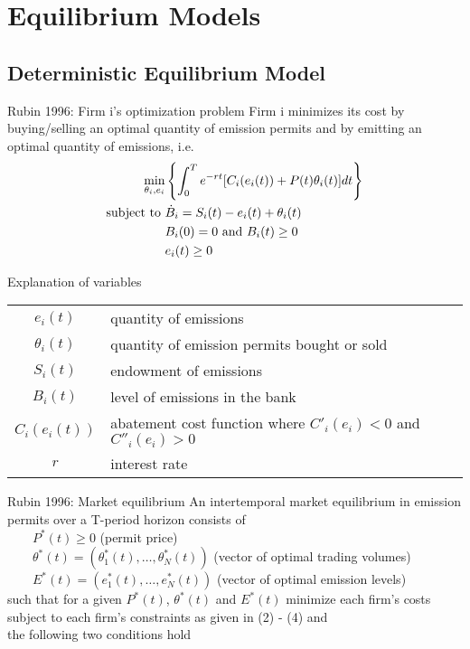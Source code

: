 \section{Equilibrium Models}
\subsection{Deterministic Equilibrium Model}

Rubin 1996: Firm i's optimization problem
	Firm i minimizes its cost by buying/selling an optimal quantity of emission permits and by emitting an optimal quantity of emissions, i.e.
		\begin{align}
		\min_{\theta_i, e_i} & \left\{ \int_0^T e^{-rt} [C_i(e_i(t)) + P(t)\theta_i(t)]dt \right\} \\
		\textnormal{subject to }
		&\dot{B}_i = S_i(t) - e_i(t) + \theta_i(t) \\
		&            B_i(0) = 0 \textnormal{ and } B_i(t) \ge 0 \\
		&            e_i(t) \ge 0
		\end{align}

	{Explanation of variables}
	\begin{tiny}
	\begin{tabular}{cl}
	$e_i(t)$ & quantity of emissions \\
	$\theta_i(t)$ & quantity of emission permits bought or sold \\
	$S_i(t)$ & endowment of emissions \\
	$B_i(t)$ & level of emissions in the bank\\
	$C_i(e_i(t))$ & abatement cost function where $C'_i(e_i) < 0$ and $C''_i(e_i) > 0$ \\
	$r$ & interest rate \\
	\end{tabular}
	\end{tiny}



Rubin 1996: Market equilibrium
	An intertemporal market equilibrium in emission permits over a T-period horizon consists of \\
		$\qquad P^*(t) \ge 0$ (permit price) \\
		$\qquad \theta^*(t) = (\theta^*_1(t), \ldots, \theta^*_N(t))$ (vector of optimal trading volumes) \\
		$\qquad E^*(t) = (e^*_1(t), \ldots, e^*_N(t))$ (vector of optimal emission levels) \\
	such that for a given $P^*(t)$,
		$\theta^*(t)$ and $E^*(t)$ minimize each firm's costs subject to each firm's constraints as given in (2) - (4) and \\
	the following two conditions hold

